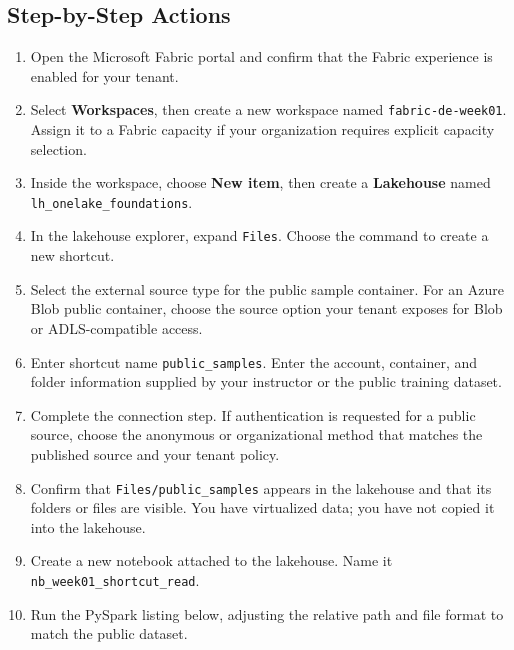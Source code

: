 \subsection{Step-by-Step Actions}
\begin{enumerate}
    \item Open the Microsoft Fabric portal and confirm that the Fabric experience is enabled for your tenant.
    \item Select \textbf{Workspaces}, then create a new workspace named \texttt{fabric-de-week01}. Assign it to a Fabric capacity if your organization requires explicit capacity selection.
    \item Inside the workspace, choose \textbf{New item}, then create a \textbf{Lakehouse} named \texttt{lh\_onelake\_foundations}.
    \item In the lakehouse explorer, expand \texttt{Files}. Choose the command to create a new shortcut.
    \item Select the external source type for the public sample container. For an Azure Blob public container, choose the source option your tenant exposes for Blob or ADLS-compatible access.
    \item Enter shortcut name \texttt{public\_samples}. Enter the account, container, and folder information supplied by your instructor or the public training dataset.
    \item Complete the connection step. If authentication is requested for a public source, choose the anonymous or organizational method that matches the published source and your tenant policy.
    \item Confirm that \texttt{Files/public\_samples} appears in the lakehouse and that its folders or files are visible. You have virtualized data; you have not copied it into the lakehouse.
    \item Create a new notebook attached to the lakehouse. Name it \texttt{nb\_week01\_shortcut\_read}.
    \item Run the PySpark listing below, adjusting the relative path and file format to match the public dataset.
\end{enumerate}

